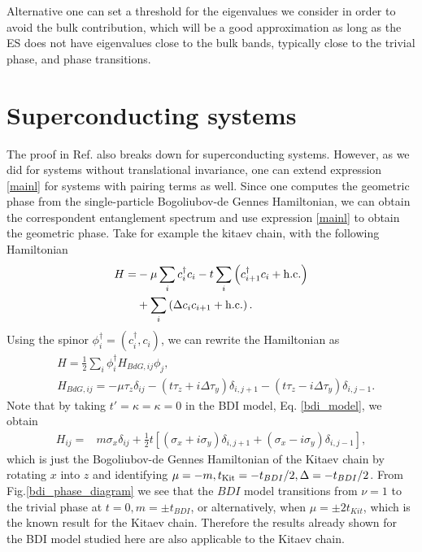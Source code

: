 \documentclass[twocolumn,amsmath,longbibliography,amssymb,superscriptaddress]{revtex4-1}
\begin{document}
Alternative one can set a threshold for the eigenvalues we consider in order to avoid the bulk contribution, which will be a good approximation as long as the ES does not have eigenvalues close to the bulk bands, typically close to the trivial phase, and phase transitions. 

\section{Superconducting systems}

The proof in Ref.\cite{Zaletel2014} also breaks down for superconducting systems. However, as we did for systems without translational invariance, one can extend expression \ref{mainl} for systems with pairing terms as well. Since one computes the geometric phase from the single-particle Bogoliubov-de Gennes Hamiltonian, we can obtain the correspondent entanglement spectrum and use expression \ref{mainl} to obtain the geometric phase. Take for example the kitaev chain, with the following Hamiltonian
\begin{align*}
H =& -\mu \sum_{i} c_i^\dagger c_i - t \sum_{i}\left( c_{i+1}^\dagger c_i + {\rm h.c.}\right) \\
&+  \sum_{i}\left( \Delta c_{i} c_{i+1} + {\rm h.c.}\right).
\end{align*}
Using the spinor $\phi_i^\dagger = (c_i^\dagger, c_i)$, we can rewrite the Hamiltonian as
\begin{align*}
&H = \frac{1}{2}\sum_i \phi^\dagger_i H_{BdG,ij} \phi_j,\\
&H_{BdG,ij} = -\mu \tau_z \delta_{ij} - (t \tau_z + i\Delta \tau_y )\delta_{i,j+1}- (t \tau_z - i\Delta \tau_y)\delta_{i,j-1}.
\end{align*}
Note that by taking $t' = \kappa = \kappa = 0$ in the BDI model, Eq. \ref{bdi_model}, we obtain
\begin{align*}
H_{ij} =& m \sigma_x\delta_{ij} + \frac{1}{2} t \left[(\sigma_x + i \sigma_y)\delta_{i,j+1} + (\sigma_x - i \sigma_y) \delta_{i,j-1} \right],
\end{align*}
which is just the Bogoliubov-de Gennes Hamiltonian of the Kitaev chain by rotating $x$ into $z$ and identifying $\mu = -m, t_{\rm Kit} = -t_{BDI}/2, \Delta = -t_{BDI}/2 $. From Fig.\ref{bdi_phase_diagram} we see that the $BDI$ model transitions from $\nu = 1$ to the trivial phase at $t=0, m=\pm t_{BDI}$, or alternatively, when $\mu = \pm 2 t_{Kit}$, which is the known result for the Kitaev chain. Therefore the results already shown for the BDI model studied here are also applicable to the Kitaev chain.  
\end{document}
